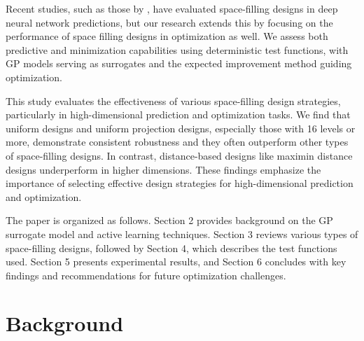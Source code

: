 \documentclass [PhD] {package/uclathes}
\begin{document}
Recent studies, such as those by \textcite{shi2023evaluating}, have evaluated space-filling designs in deep neural network predictions, but our research extends this by focusing on the performance of space filling designs in optimization as well. We assess both predictive and minimization capabilities using deterministic test functions, with GP models serving as surrogates and the expected improvement method guiding optimization.

This study evaluates the effectiveness of various space-filling design strategies, particularly in high-dimensional prediction and optimization tasks. %
We find that uniform designs and uniform projection designs, especially those with 16 levels or more, demonstrate consistent robustness and they often outperform other types of space-filling designs. In contrast, distance-based designs like maximin distance designs underperform in higher dimensions.
These findings emphasize the importance of selecting effective design strategies for high-dimensional prediction and optimization.



The paper is organized as follows.
Section 2 provides background on the GP surrogate model and active learning techniques. Section 3 reviews various types of space-filling designs, followed by Section 4, which describes the test functions used. Section 5 presents experimental results, and Section 6 concludes with key findings and recommendations for future optimization challenges.

\section{Background}
\end{document}
